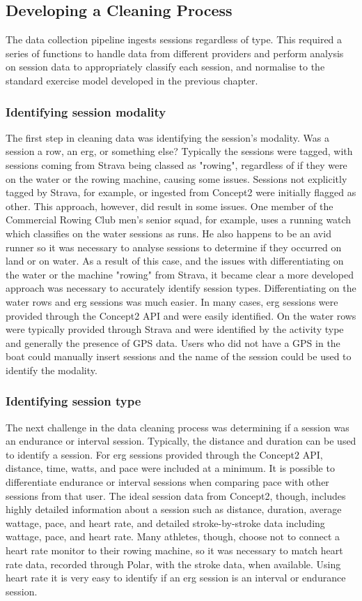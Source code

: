 \subsection{Developing a Cleaning Process}
The data collection pipeline ingests sessions regardless of type. This required a series of functions to handle data from different providers and perform analysis on session data to appropriately classify each session, and normalise to the standard exercise model developed in the previous chapter.

\subsubsection{Identifying session modality}
The first step in cleaning data was identifying the session's modality. Was a session a row, an erg, or something else? Typically the sessions were tagged, with sessions coming from Strava being classed as "rowing", regardless of if they were on the water or the rowing machine, causing some issues. Sessions not explicitly tagged by Strava, for example, or ingested from Concept2 were initially flagged as other. This approach, however, did result in some issues. One member of the Commercial Rowing Club men's senior squad, for example, uses a running watch which classifies on the water sessions as runs. He also happens to be an avid runner so it was necessary to analyse sessions to determine if they occurred on land or on water. As a result of this case, and the issues with differentiating on the water or the machine "rowing" from Strava, it became clear a more developed approach was necessary to accurately identify session types. Differentiating on the water rows and erg sessions was much easier. In many cases, erg sessions were provided through the Concept2 API and were easily identified. On the water rows were typically provided through Strava and were identified by the activity type and generally the presence of GPS data. Users who did not have a GPS in the boat could manually insert sessions and the name of the session could be used to identify the modality.


\subsubsection{Identifying session type}
The next challenge in the data cleaning process was determining if a session was an endurance or interval session. Typically, the distance and duration can be used to identify a session. For erg sessions provided through the Concept2 API, distance, time, watts, and pace were included at a minimum. It is possible to differentiate endurance or interval sessions when comparing pace with other sessions from that user. The ideal session data from Concept2, though, includes highly detailed information about a session such as distance, duration, average wattage, pace, and heart rate, and detailed stroke-by-stroke data including wattage, pace, and heart rate. Many athletes, though, choose not to connect a heart rate monitor to their rowing machine, so it was necessary to match heart rate data, recorded through Polar, with the stroke data, when available. Using heart rate it is very easy to identify if an erg session is an interval or endurance session.

